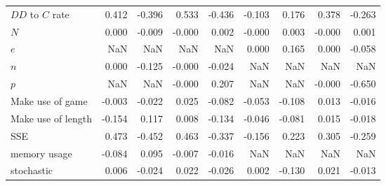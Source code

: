 \begin{tabular}{lrrrrrrrr}
$DD$ to $C$ rate     &            0.412 &        -0.396 &            0.533 &        -0.436 &           -0.103 &         0.176 &            0.378 &        -0.263 \\
$N$                  &            0.000 &        -0.009 &           -0.000 &         0.002 &           -0.000 &         0.003 &           -0.000 &         0.001 \\
$e$                  &              NaN &           NaN &              NaN &           NaN &            0.000 &         0.165 &            0.000 &        -0.058 \\
$n$                  &            0.000 &        -0.125 &           -0.000 &        -0.024 &              NaN &           NaN &              NaN &           NaN \\
$p$                  &              NaN &           NaN &           -0.000 &         0.207 &              NaN &           NaN &           -0.000 &        -0.650 \\
Make use of game     &           -0.003 &        -0.022 &            0.025 &        -0.082 &           -0.053 &        -0.108 &            0.013 &        -0.016 \\
Make use of length   &           -0.154 &         0.117 &            0.008 &        -0.134 &           -0.046 &        -0.081 &            0.015 &        -0.018 \\
SSE                  &            0.473 &        -0.452 &            0.463 &        -0.337 &           -0.156 &         0.223 &            0.305 &        -0.259 \\
memory usage         &           -0.084 &         0.095 &           -0.007 &        -0.016 &              NaN &           NaN &              NaN &           NaN \\
stochastic           &            0.006 &        -0.024 &            0.022 &        -0.026 &            0.002 &        -0.130 &            0.021 &        -0.013 \\
\bottomrule
\end{tabular}
